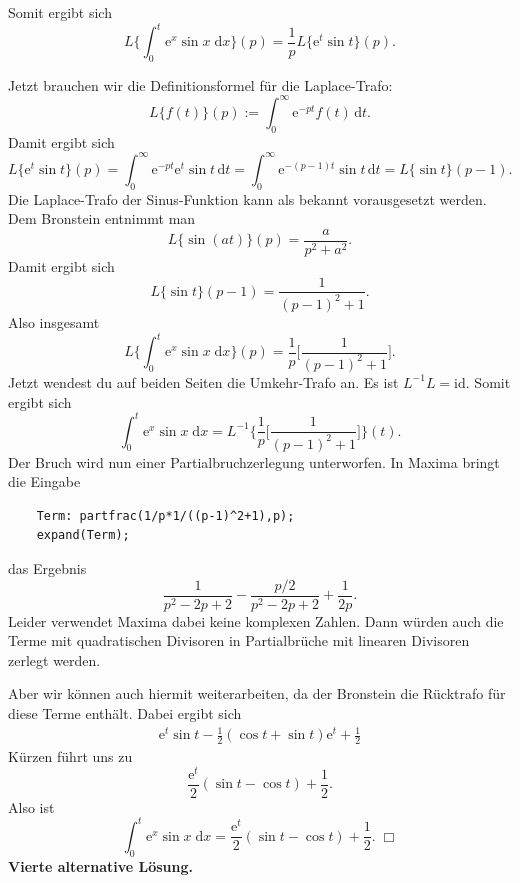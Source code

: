 \documentclass[a4paper,10pt,fleqn,twoside]{scrartcl}
\numberwithin{equation}{section}
\newcommand{\ee}{\mathrm e}
\newcommand{\strong}[1]{{\normalfont\sffamily\bfseries #1}}
\theoremstyle{Aufgabe}
\begin{document}
Somit ergibt sich
\begin{equation}
L\bigg\{\int_0^t \ee^x\sin x\;\mathrm dx\bigg\}(p)
=\frac{1}{p}L\{\ee^t\sin t\}(p).
\end{equation}

Jetzt brauchen wir die Definitionsformel für die
Laplace-Trafo:
\begin{equation}
L\{f(t)\}(p):=\int_0^{\infty} \ee^{-pt}f(t)\,\mathrm dt.
\end{equation}
Damit ergibt sich
\begin{equation}
L\{\ee^t\sin t\}(p)
= \int_0^{\infty} \ee^{-pt}\ee^t\sin t\,\mathrm dt
= \int_0^{\infty} \ee^{-(p-1)t}\sin t\,\mathrm dt
= L\{\sin t\}(p-1).
\end{equation}
Die Laplace-Trafo der Sinus-Funktion kann als bekannt
vorausgesetzt werden. Dem Bronstein entnimmt man
\begin{equation}
L\{\sin(at)\}(p) = \frac{a}{p^2+a^2}.
\end{equation}
Damit ergibt sich
\begin{equation}
L\{\sin t\}(p-1) = \frac{1}{(p-1)^2+1}.
\end{equation}
Also insgesamt
\begin{equation}
L\bigg\{\int_0^t \ee^x\sin x\;\mathrm dx\bigg\}(p)
= \frac{1}{p}\bigg[\frac{1}{(p-1)^2+1}\bigg].
\end{equation}
Jetzt wendest du auf beiden Seiten die Umkehr-Trafo an. Es ist
$L^{-1}L=\mathrm{id}$. Somit ergibt sich%
\begin{equation}
\int_0^t \ee^x\sin x\;\mathrm dx
= L^{-1}\bigg\{\frac{1}{p}\bigg[\frac{1}{(p-1)^2+1}\bigg]\bigg\}(t).
\end{equation}
Der Bruch wird nun einer Partialbruchzerlegung unterworfen.
In Maxima bringt die Eingabe
\begin{verbatim}
    Term: partfrac(1/p*1/((p-1)^2+1),p);
    expand(Term);
\end{verbatim}
das Ergebnis
\begin{equation}
\frac{1}{p^2-2p+2}-\frac{p/2}{p^2-2p+2}+\frac{1}{2p}.
\end{equation}
Leider verwendet Maxima dabei keine komplexen Zahlen. Dann würden
auch die Terme mit quadratischen Divisoren in Partialbrüche
mit linearen Divisoren zerlegt werden.

Aber wir können auch hiermit weiterarbeiten, da der Bronstein
die Rücktrafo für diese Terme enthält. Dabei ergibt sich
\begin{gather*}
\ee^t\sin t - \frac{1}{2}(\cos t+\sin t)\ee^t + \frac{1}{2}
\end{gather*}
Kürzen führt uns zu
\begin{equation}
\frac{\ee^t}{2}(\sin t-\cos t)+\frac{1}{2}.
\end{equation}
Also ist
\begin{equation}
\int_0^t \ee^x\sin x\;\mathrm dx
= \frac{\ee^t}{2}(\sin t-\cos t)+\frac{1}{2}.\;\Box
\end{equation}
%
\strong{Vierte alternative Lösung.}
\end{document}
